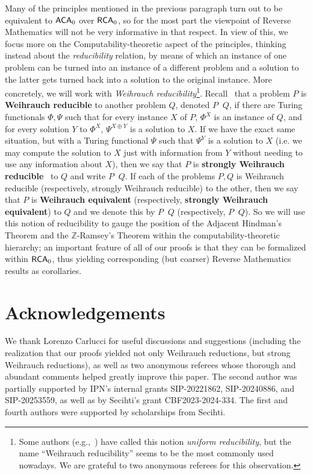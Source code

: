 \documentclass[10pt,a4paper]{amsart}
\newcommand{\rca}{\mathnormal{\mathsf{RCA}}_0}
\newcommand{\aca}{\mathnormal{\mathsf{ACA}}_0}
\newcommand{\weileq}{\mathop{\leq_{\mathsf{W}}}}
\newcommand{\weisleq}{\mathop{\leq_{\mathrm{s}\mathsf{W}}}}
\newcommand{\weieq}{\mathop{\equiv_{\mathsf{W}}}}
\newcommand{\weiseq}{\mathop{\equiv_{\mathrm{s}\mathsf{W}}}}
\theoremstyle{definition}
\begin{document}
Many of the principles mentioned in the previous paragraph turn out to be equivalent to $\aca$ over $\rca$, so for the most part the viewpoint of Reverse Mathematics will not be very informative in that respect. In view of this, we focus more on the Computability-theoretic aspect of the principles, thinking instead about the {\it reducibility} relation, by means of which an instance of one problem can be turned into an instance of a different problem and a solution to the latter gets turned back into a solution to the original instance. More concretely, we will work with {\it Weihrauch reducibility}\footnote{Some authors (e.g.,~\cite[p. 22]{hirschfeldt}) have called this notion {\it uniform reducibility}, but the name ``Weihrauch reducibility'' seems to be the most commonly used nowadays. We are grateful to two anonymous referees for this observation.}. Recall~\cite[Definition 4.3.1]{dzhafarov-mummert-textbook} that a problem $P$ is {\bf Weihrauch reducible} to another problem $Q$, denoted $P\weileq Q$, if there are Turing functionals $\Phi,\Psi$ such that for every instance $X$ of $P$, $\Phi^X$ is an instance of $Q$, and for every solution $Y$ to $\Phi^X$, $\Psi^{X\oplus Y}$ is a solution to $X$. If we have the exact same situation, but with a Turing functional $\Psi$ such that $\Psi^Y$ is a solution to $X$ (i.e. we may compute the solution to $X$ just with information from $Y$ without needing to use any information about $X$), then we say that $P$ is {\bf strongly Weihrauch reducible}~\cite[Definition 4.4.1]{dzhafarov-mummert-textbook} to $Q$ and write $P\weisleq Q$. If each of the problems $P,Q$ is Weihrauch reducible (respectively, strongly Weihrauch reducible) to the other, then we say that $P$ is {\bf Weihrauch equivalent} (respectively, {\bf strongly Weihrauch equivalent}) to $Q$ and we denote this by $P\weieq Q$ (respectively, $P\weiseq Q$). So we will use this notion of reducibility to gauge the position of the Adjacent Hindman's Theorem and the $\mathbb Z$-Ramsey's Theorem within the computability-theoretic hierarchy; an important feature of all of our proofs is that they can be formalized within $\rca$, thus yielding corresponding (but coarser) Reverse Mathematics results as corollaries.

\section*{Acknowledgements}

We thank Lorenzo Carlucci for useful discussions and suggestions (including the realization that our proofs yielded not only Weihrauch reductions, but strong Weihrauch reductions), as well as two anonymous referees whose thorough and abundant comments helped greatly improve this paper. The second author was partially supported by IPN's internal grants SIP-20221862, SIP-20240886, and SIP-20253559, as well as by Secihti's grant CBF2023-2024-334. The first and fourth authors were supported by scholarships from Secihti.
\end{document}
